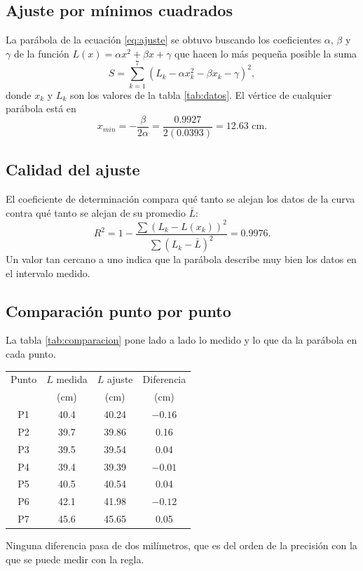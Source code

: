 \subsection{Ajuste por mínimos cuadrados}
La parábola de la ecuación \eqref{eq:ajuste} se obtuvo buscando los coeficientes $\alpha$, $\beta$ y $\gamma$ de la función $L(x) = \alpha x^2 + \beta x + \gamma$ que hacen lo más pequeña posible la suma
\begin{equation}
S = \sum_{k=1}^{7} \left( L_k - \alpha x_k^2 - \beta x_k - \gamma \right)^2 ,
\label{eq:minimos}
\end{equation}
donde $x_k$ y $L_k$ son los valores de la tabla \ref{tab:datos}. El vértice de cualquier parábola está en
\begin{equation}
x_{min} = -\frac{\beta}{2\alpha} = \frac{0.9927}{2(0.0393)} = 12.63 \text{ cm}.
\label{eq:vertice}
\end{equation}

\subsection{Calidad del ajuste}
El coeficiente de determinación compara qué tanto se alejan los datos de la curva contra qué tanto se alejan de su promedio $\bar{L}$:
\begin{equation}
R^2 = 1 - \frac{\sum (L_k - L(x_k))^2}{\sum (L_k - \bar{L})^2} = 0.9976 .
\label{eq:r2}
\end{equation}
Un valor tan cercano a uno indica que la parábola describe muy bien los datos en el intervalo medido.

\subsection{Comparación punto por punto}
La tabla \ref{tab:comparacion} pone lado a lado lo medido y lo que da la parábola en cada punto.

\begin{center}
\begin{tabular}{cccc}
\hline
Punto & $L$ medida & $L$ ajuste & Diferencia \\
 & (cm) & (cm) & (cm) \\
\hline
P1 & 40.4 & 40.24 & $-0.16$ \\
P2 & 39.7 & 39.86 & 0.16 \\
P3 & 39.5 & 39.54 & 0.04 \\
P4 & 39.4 & 39.39 & $-0.01$ \\
P5 & 40.5 & 40.54 & 0.04 \\
P6 & 42.1 & 41.98 & $-0.12$ \\
P7 & 45.6 & 45.65 & 0.05 \\
\hline
\end{tabular}
\label{tab:comparacion}
\end{center}

Ninguna diferencia pasa de dos milímetros, que es del orden de la precisión con la que se puede medir con la regla.
